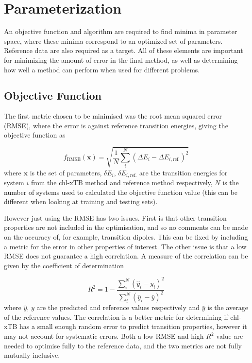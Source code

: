 \afterpartskip
\section{Parameterization}
\label{sec:chl_params}
An objective function and algorithm are required to find minima in parameter space,
where these minima correspond to an optimized set of parameters. Reference data 
are also required as a target. All of these elements are important for minimizing 
the amount of error in the final method, as well as determining how well a method 
can perform when used for different problems.

\subsection{Objective Function}
\label{subsec:obj_func}
The first metric chosen to be minimised was the root mean squared error (RMSE), 
where the error is against reference transition energies, giving the objective function 
as

\begin{equation}
f_{\text{RMSE}}\left(\mathbf{x}\right) = \sqrt{ \frac{1}{N} \sum^N_i \left( \Delta E_i  - \Delta E_{i, \text{ref.}}\right)^2}
\end{equation}
%
where $\textbf{x}$ is the set of parameters, $\delta E_i$, $\delta E_{i,\text{ref.}}$ 
are the transition energies for system $i$ from the chl-xTB method and reference
method respectively, $N$ is the number of systems used to calculated the objective
function value (this can be different when looking at training and testing sets).

However just using the RMSE has two issues. First is that other transition properties
are not included in the optimisation, and so no comments can be made on the accuracy 
of, for example, transition dipoles. This can be fixed by including a metric for
the error in other properties of interest. The other issue is that a low RMSE does
not guarantee a high correlation. A measure of the correlation can be given by the
coefficient of determination

\begin{equation}
R^2 = 1 - \frac{\sum^N_i \left(\hat{y}_i - y_i \right)^2}{\sum^N_i \left(\hat{y}_i - \bar{y}\right)^2}
\end{equation}
%
where $\hat{y}$, $y$ are the predicted and reference values respectively and $\bar{y}$
is the average of the reference values. The correlation is a better metric for determining
if chl-xTB has a small enough random error to predict transition properties, however
it may not account for systematic errors. Both a low RMSE and high $R^2$ value are
needed to optimise fully to the reference data, and the two metrics are not fully
mutually inclusive.


